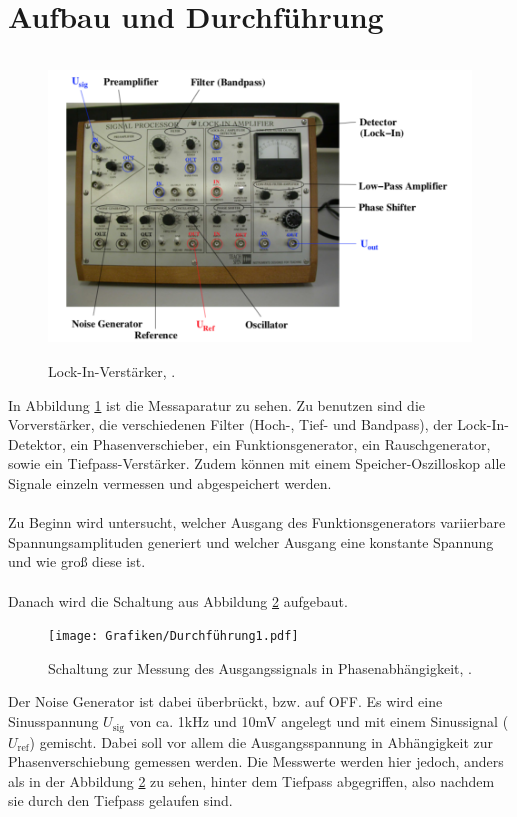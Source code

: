 \section{Aufbau und Durchführung}
\begin{figure}[H]
  \centering
  \includegraphics[height=8cm]{Grafiken/Aufbau.pdf}
  \caption{Lock-In-Verstärker, \cite{1}.}
  \label{fig:Verstärker}
\end{figure}
In Abbildung \ref{fig:Verstärker} ist die Messaparatur zu sehen. 
Zu benutzen sind die Vorverstärker, die verschiedenen Filter (Hoch-, Tief- und Bandpass), der Lock-In-Detektor, ein Phasenverschieber, ein Funktionsgenerator, ein Rauschgenerator, sowie ein Tiefpass-Verstärker.
Zudem können mit einem Speicher-Oszilloskop alle Signale einzeln vermessen und abgespeichert werden.
\\
\\
Zu Beginn wird untersucht, welcher Ausgang des Funktionsgenerators variierbare Spannungsamplituden generiert und welcher Ausgang eine konstante Spannung und wie groß diese ist.
\\
\\
Danach wird die Schaltung aus Abbildung \ref{fig:Aufbau1} aufgebaut.
\begin{figure}[h]
  \centering
  \texttt{[image: Grafiken/Durchführung1.pdf]}
  \caption{Schaltung zur Messung des Ausgangssignals in Phasenabhängigkeit, \cite{1}.}
  \label{fig:Aufbau1}
\end{figure}
Der Noise Generator ist dabei überbrückt, bzw. auf OFF. Es wird eine Sinusspannung $U_\text{sig}$ von ca. 1kHz und 10mV angelegt und mit einem Sinussignal ($U_\text{ref}$) gemischt. Dabei soll vor allem die Ausgangsspannung in Abhängigkeit zur Phasenverschiebung gemessen werden.
Die Messwerte werden hier jedoch, anders als in der Abbildung \ref{fig:Aufbau1} zu sehen, hinter dem Tiefpass abgegriffen, also nachdem sie durch den Tiefpass gelaufen sind.
